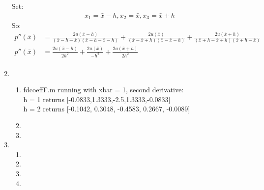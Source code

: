 \documentclass{article}
\begin{document}
\begin{enumerate}
\begin{equation*}
\end{equation*}
Set:
\begin{equation*}
\begin{split}
x_{1} = \bar{x}-h, x_{2} = \bar{x}, x_{3} = \bar{x}+h
\end{split}
\end{equation*}
So:
\begin{equation*}
\begin{split}
p''(\bar{x}) & = \frac{2u(\bar{x}-h)}{(\bar{x}-h-\bar{x})(\bar{x}-h-\bar{x}-h)}+\frac{2u(\bar{x})}{(\bar{x}-\bar{x}+h)(\bar{x}-\bar{x}-h)}+\frac{2u(\bar{x}+h)}{(\bar{x}+h-\bar{x}+h)(\bar{x}+h-\bar{x})}\\
p''(\bar{x}) & = \frac{2u(\bar{x}-h)}{2h^{2}}+\frac{2u(\bar{x})}{-h^{2}}+\frac{2u(\bar{x}+h)}{2h^{2}}\\
\end{split}
\end{equation*}
\item
\begin{enumerate}
\item fdcoeffF.m running with xbar = 1, second derivative: \\
 h = 1 returns [-0.0833,1.3333,-2.5,1.3333,-0.0833] \\
h = 2 returns [-0.1042, 0.3048, -0.4583, 0.2667, -0.0089] 
\item
\item
\end{enumerate}
\item
\begin{enumerate}
\item
\item
\item
\item

\end{enumerate}
\end{enumerate}
\end{document}
